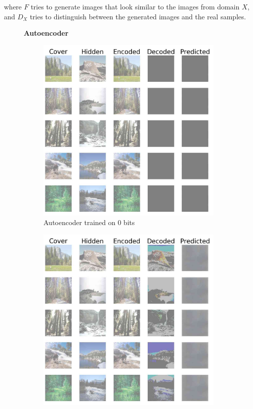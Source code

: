 \documentclass[conference]{IEEEtran}
\begin{document}
where $F$ tries to generate images that look similar to the images from domain $X$, and $D_X$ tries to distinguish between the generated images and the real samples.

\begin{figure}[!hbt]
\centering
\textbf{Autoencoder}\par\medskip
    \begin{subfigure}[b]{0.28\textwidth}
    \centering
            \includegraphics[scale=0.13,clip=false]{images/sten_0.jpg}
            \caption{Autoencoder trained on 0 bits}
            \label{autoencoder_0}
    \end{subfigure}
    \hspace{0.05\textwidth}
    \begin{subfigure}[b]{0.28\textwidth}
    \centering
            \includegraphics[scale=0.13,clip=false]{images/sten_1.jpg}

\end{subfigure}
\end{figure}
\end{document}
